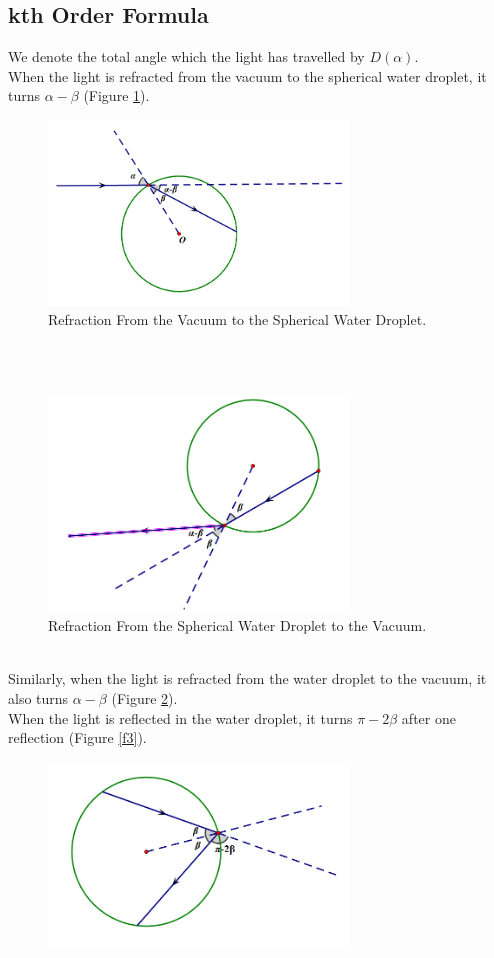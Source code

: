 \documentclass{article}
\begin{document}
\begin{spacing}{1.5}
\subsection{kth Order Formula}
We denote the total angle which the light has travelled by $D(\alpha)$.\\
When the light is refracted from the vacuum to the spherical water droplet, it turns $\alpha - \beta$ (Figure \ref{f1}).\\
\begin{figure}[!htb]
\centering
\includegraphics[width=8cm]{4.png}
\caption{Refraction From the Vacuum to the Spherical Water Droplet.}
\label{f1}
\end{figure}
\\
\newpage
\ \\
\begin{figure}[!htb]
\centering
\includegraphics[width=8cm]{5.png}
\caption{Refraction From the Spherical Water Droplet to the Vacuum.}
\label{f2}
\end{figure}
\\
Similarly, when the light is refracted from the water droplet to the vacuum, it also turns $\alpha - \beta$ (Figure \ref{f2}).\\
When the light is reflected in the water droplet, it turns $\pi-2\beta$ after one reflection (Figure \ref{f3}).\\
\begin{figure}[!htb]
\centering
\includegraphics[width=8cm]{6.png}

\end{figure}
\end{spacing}
\end{document}
